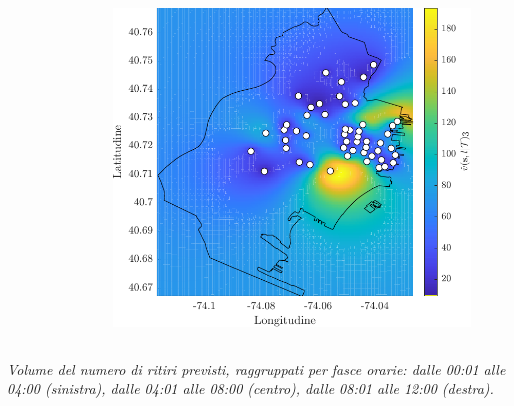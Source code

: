 \begin{frame}
\begin{columns}
\begin{column}{0.33\linewidth}
\begin{figure}
			\end{figure}
		\end{column}
		\begin{column}{0.33\linewidth}
			\centering
			\begin{figure}
				\includegraphics[width=\textwidth]{../Tesi/Immagini/4. Caso di studio/Kriging/Mappa volume, 3}
			\end{figure}
		\end{column}
	\end{columns}
	\vspace{10pt}
	\textit{Volume del numero di ritiri previsti, raggruppati per fasce orarie: dalle 00:01 alle 04:00 (sinistra), dalle 04:01 alle 08:00 (centro), dalle 08:01 alle 12:00 (destra).}
\end{frame}

